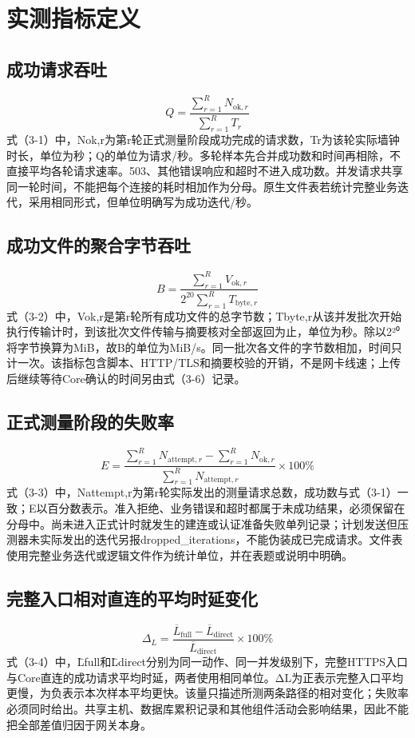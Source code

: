 \documentclass{ctexart}
\begin{document}
\section*{实测指标定义}
\subsection*{成功请求吞吐}
\begin{equation}
Q = \frac{\sum_{r=1}^{R} N_{\mathrm{ok},r}}{\sum_{r=1}^{R} T_r}\tag{3-1}
\end{equation}
式（3-1）中，Nok,r为第r轮正式测量阶段成功完成的请求数，Tr为该轮实际墙钟时长，单位为秒；Q的单位为请求/秒。多轮样本先合并成功数和时间再相除，不直接平均各轮请求速率。503、其他错误响应和超时不进入成功数。并发请求共享同一轮时间，不能把每个连接的耗时相加作为分母。原生文件表若统计完整业务迭代，采用相同形式，但单位明确写为成功迭代/秒。
\subsection*{成功文件的聚合字节吞吐}
\begin{equation}
B = \frac{\sum_{r=1}^{R} V_{\mathrm{ok},r}}{2^{20}\sum_{r=1}^{R} T_{\mathrm{byte},r}}\tag{3-2}
\end{equation}
式（3-2）中，Vok,r是第r轮所有成功文件的总字节数；Tbyte,r从该并发批次开始执行传输计时，到该批次文件传输与摘要核对全部返回为止，单位为秒。除以2²⁰将字节换算为MiB，故B的单位为MiB/s。同一批次各文件的字节数相加，时间只计一次。该指标包含脚本、HTTP/TLS和摘要校验的开销，不是网卡线速；上传后继续等待Core确认的时间另由式（3-6）记录。
\subsection*{正式测量阶段的失败率}
\begin{equation}
E = \frac{\sum_{r=1}^{R}N_{\mathrm{attempt},r}-\sum_{r=1}^{R}N_{\mathrm{ok},r}}{\sum_{r=1}^{R}N_{\mathrm{attempt},r}}\times100\%\tag{3-3}
\end{equation}
式（3-3）中，Nattempt,r为第r轮实际发出的测量请求总数，成功数与式（3-1）一致；E以百分数表示。准入拒绝、业务错误和超时都属于未成功结果，必须保留在分母中。尚未进入正式计时就发生的建连或认证准备失败单列记录；计划发送但压测器未实际发出的迭代另报dropped\_iterations，不能伪装成已完成请求。文件表使用完整业务迭代或逻辑文件作为统计单位，并在表题或说明中明确。
\subsection*{完整入口相对直连的平均时延变化}
\begin{equation}
\Delta_L = \frac{\overline{L}_{\mathrm{full}}-\overline{L}_{\mathrm{direct}}}{\overline{L}_{\mathrm{direct}}}\times100\%\tag{3-4}
\end{equation}
式（3-4）中，L̄full和L̄direct分别为同一动作、同一并发级别下，完整HTTPS入口与Core直连的成功请求平均时延，两者使用相同单位。ΔL为正表示完整入口平均更慢，为负表示本次样本平均更快。该量只描述所测两条路径的相对变化；失败率必须同时给出。共享主机、数据库累积记录和其他组件活动会影响结果，因此不能把全部差值归因于网关本身。
\end{document}
